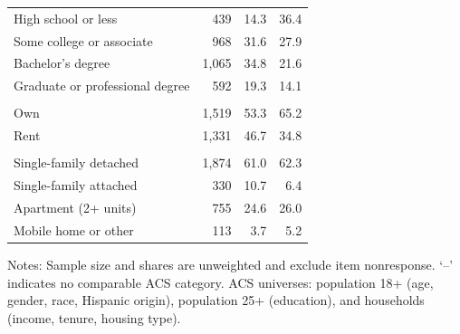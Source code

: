 \begin{table}[pos=H]
\begin{tabular}{lrrr}
\quad High school or less & 439 & 14.3 & 36.4 \\
\quad Some college or associate & 968 & 31.6 & 27.9 \\
\quad Bachelor's degree & 1,065 & 34.8 & 21.6 \\
\quad Graduate or professional degree & 592 & 19.3 & 14.1 \\
\addlinespace[2pt]
\multicolumn{4}{l}{\textit{Housing tenure}} \\
\quad Own & 1,519 & 53.3 & 65.2 \\
\quad Rent & 1,331 & 46.7 & 34.8 \\
\addlinespace[2pt]
\multicolumn{4}{l}{\textit{Housing type}} \\
\quad Single-family detached & 1,874 & 61.0 & 62.3 \\
\quad Single-family attached & 330 & 10.7 & 6.4 \\
\quad Apartment (2+ units) & 755 & 24.6 & 26.0 \\
\quad Mobile home or other & 113 & 3.7 & 5.2 \\
\bottomrule
\end{tabular}
\begin{minipage}{0.8\textwidth}
\vspace{4pt}\footnotesize
Notes: Sample size and shares are unweighted and exclude item nonresponse. `--' indicates no comparable ACS category. ACS universes: population 18+ (age, gender, race, Hispanic origin), population 25+ (education), and households (income, tenure, housing type).
\end{minipage}
\end{table}


